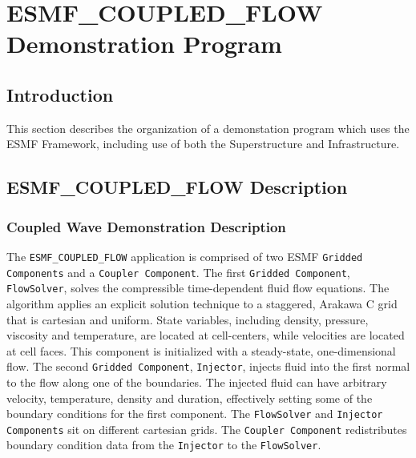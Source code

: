 
\section{ESMF\_COUPLED\_FLOW Demonstration Program}
\label{sec:demo}

\subsection{Introduction}

This section describes the organization of a
demonstation program which uses the ESMF Framework,
including use of both the 
Superstructure and Infrastructure.

\subsection{ESMF\_COUPLED\_FLOW Description}
 
\subsubsection{Coupled Wave Demonstration Description}

The {\tt ESMF\_COUPLED\_FLOW} application is comprised of two ESMF 
{\tt Gridded Components} and a {\tt Coupler Component}.  
The first {\tt Gridded Component}, {\tt FlowSolver}, solves the compressible 
time-dependent fluid flow equations.  The algorithm 
applies an explicit solution technique to a staggered, Arakawa C grid 
that is cartesian and uniform.  State variables, including density, 
pressure, viscosity and temperature, are located at cell-centers, while 
velocities are located at cell faces.  This component is initialized 
with a steady-state, one-dimensional flow.  The second {\tt Gridded 
Component}, {\tt Injector}, injects fluid into the first normal to the 
flow along 
one of the boundaries.  The injected fluid can have arbitrary velocity, 
temperature, density and duration, effectively setting some of 
the boundary conditions for the first component.  The {\tt FlowSolver} and 
{\tt Injector Components} sit on different cartesian grids.  The
{\tt Coupler Component} redistributes boundary condition data from 
the {\tt Injector} to the {\tt FlowSolver}.


